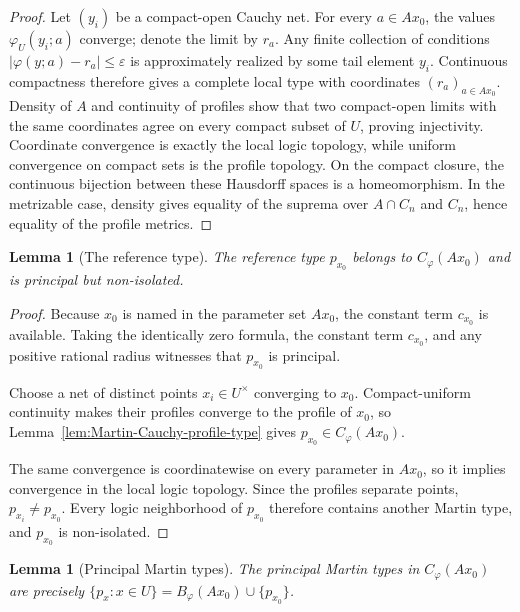 \documentclass{amsart}
\newtheorem{lemma}[theorem]{Lemma}
\theoremstyle{definition}
\theoremstyle{remark}
\numberwithin{equation}{section}
\begin{document}
\begin{proof}
	Let $(y_i)$ be a compact-open Cauchy net. For every $a\in Ax_0$, the values $\varphi_U(y_i;a)$ converge; denote the limit by $r_a$. Any finite collection of conditions $|\varphi(y;a)-r_a|\le\varepsilon$ is approximately realized by some tail element $y_i$. Continuous compactness therefore gives a complete local type with coordinates $(r_a)_{a\in Ax_0}$. Density of $A$ and continuity of profiles show that two compact-open limits with the same coordinates agree on every compact subset of $U$, proving injectivity. Coordinate convergence is exactly the local logic topology, while uniform convergence on compact sets is the profile topology. On the compact closure, the continuous bijection between these Hausdorff spaces is a homeomorphism. In the metrizable case, density gives equality of the suprema over $A\cap C_n$ and $C_n$, hence equality of the profile metrics.
\end{proof}

\begin{lemma}[The reference type]
	\label{lem:reference-Martin-type}
	The reference type $p_{x_0}$ belongs to $C_\varphi(Ax_0)$ and is
	principal but non-isolated.
\end{lemma}

\begin{proof}
	Because $x_0$ is named in the parameter set $Ax_0$, the constant term
	$c_{x_0}$ is available. Taking the identically zero formula, the
	constant term $c_{x_0}$, and any positive rational radius witnesses
	that $p_{x_0}$ is principal.
	
	Choose a net of distinct points $x_i\in U^\times$ converging to $x_0$. Compact-uniform continuity makes their profiles converge to the profile of $x_0$, so Lemma~\ref{lem:Martin-Cauchy-profile-type} gives $p_{x_0}\in C_\varphi(Ax_0)$.
	
	The same convergence is coordinatewise on every parameter in $Ax_0$,
	so it implies convergence in the local logic topology. Since the
	profiles separate points, $p_{x_i}\ne p_{x_0}$. Every logic
	neighborhood of $p_{x_0}$ therefore contains another Martin type, and
	$p_{x_0}$ is non-isolated.
\end{proof}


\begin{lemma}[Principal Martin types]
	\label{lem:principal-Martin-types}
	The principal Martin types in $C_\varphi(Ax_0)$ are precisely
	$\{p_x:x\in U\}=B_\varphi(Ax_0)\cup\{p_{x_0}\}$.
\end{lemma}
\end{document}
